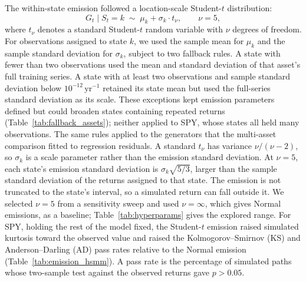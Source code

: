 The within-state emission followed a location-scale Student-$t$
distribution:
\begin{equation}
    G_t \mid S_t = k \;\sim\; \mu_k + \sigma_k \cdot t_{\nu},
    \qquad \nu = 5,
    \label{eq:emission}
\end{equation}
where $t_\nu$ denotes a standard Student-$t$ random variable with
$\nu$ degrees of freedom. For observations assigned to state $k$,
we used the sample mean for $\mu_k$ and the sample standard
deviation for $\sigma_k$, subject to two fallback rules. A state
with fewer than two observations used the mean and standard
deviation of that asset's full training series. A state with at
least two observations and sample standard deviation below $10^{-12}\,\mathrm{yr}^{-1}$
retained its state mean but used the full-series standard deviation
as its scale. These exceptions kept emission parameters defined but could broaden
states containing repeated returns (Table~\ref{tab:fallback_assets});
neither applied to SPY, whose states all held many observations. The same rules applied to the
generators that the multi-asset comparison fitted to regression
residuals. A standard $t_\nu$ has variance $\nu/(\nu-2)$, so
$\sigma_k$ is a scale parameter rather than the emission standard
deviation. At $\nu=5$, each state's emission standard deviation is
$\sigma_k\sqrt{5/3}$, larger than the sample standard deviation of
the returns assigned to that state. The emission is not truncated to
the state's interval, so a simulated return can fall outside it. We
selected $\nu = 5$ from a
sensitivity sweep and used $\nu = \infty$, which gives Normal
emissions, as a baseline; Table~\ref{tab:hyperparams} gives the
explored range. For SPY, holding the rest of the model fixed, the
Student-$t$ emission raised simulated kurtosis toward the observed value and
raised the Kolmogorov--Smirnov (KS) and Anderson--Darling (AD) pass
rates relative to the Normal emission (Table~\ref{tab:emission_hsmm}).
A pass rate is the percentage of simulated paths whose two-sample
test against the observed returns gave $p>0.05$.


